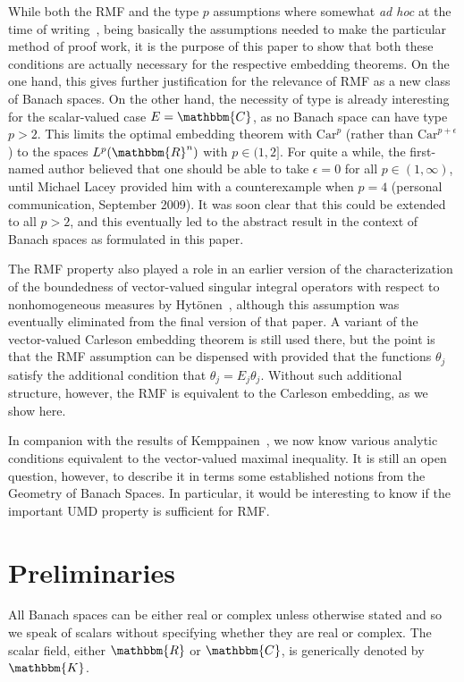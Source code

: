 \documentclass[a4paper,10pt]{amsart}
\theoremstyle{plain}
\theoremstyle{definition}
\theoremstyle{remark}
\begin{document}
While both the RMF and the type $p$ assumptions where somewhat \emph{ad hoc} at the time of writing~\cite{HMP}, being basically the assumptions needed to make the particular method of proof work, it is the purpose of this paper to show that both these conditions are actually necessary for the respective embedding theorems. On the one hand, this gives further justification for the relevance of RMF as a new class of Banach spaces. On the other hand, the necessity of type is already interesting for the scalar-valued case $E={\mathbbm{C}}$, as no Banach space can have type $p>2$. This limits the optimal embedding theorem with $\text{Car}^p$ (rather than $\text{Car}^{p+\epsilon}$) to the spaces $L^p({\mathbbm{R}}^n)$ with $p\in(1,2]$. For quite a while, the first-named author believed that one should be able to take $\epsilon=0$ for all $p\in(1,\infty)$, until Michael Lacey provided him with a counterexample when $p=4$ (personal communication, September 2009). It was soon clear that this could be extended to all $p>2$, and this eventually led to the abstract result in the context of Banach spaces as formulated in this paper.

The RMF property also played a role in an earlier version of the characterization of the boundedness of vector-valued singular integral operators with respect to nonhomogeneous measures by Hyt\"onen~\cite{HYTONENNONHOMTB}, although this assumption was eventually eliminated from the final version of that paper. A variant of the vector-valued Carleson embedding theorem is still used there, but the point is that  the RMF assumption can be dispensed with provided that the functions $\theta_j$ satisfy the additional condition that $\theta_j=E_j\theta_j$. Without such additional structure, however, the RMF is equivalent to the Carleson embedding, as we show here.

In companion with the results of Kemppainen~\cite{RMF}, we now know various analytic conditions equivalent to the vector-valued maximal inequality. It is still an open question, however, to describe it in terms some established notions from the Geometry of Banach Spaces. In particular, it would be interesting to know if the important UMD property is sufficient for RMF.

\section{Preliminaries}

All Banach spaces can be either real or complex unless otherwise stated and so we speak of scalars without 
specifying whether they are real or complex. The scalar field, either ${\mathbbm{R}}$ or ${\mathbbm{C}}$, is generically denoted by ${\mathbbm{K}}$.
\end{document}
